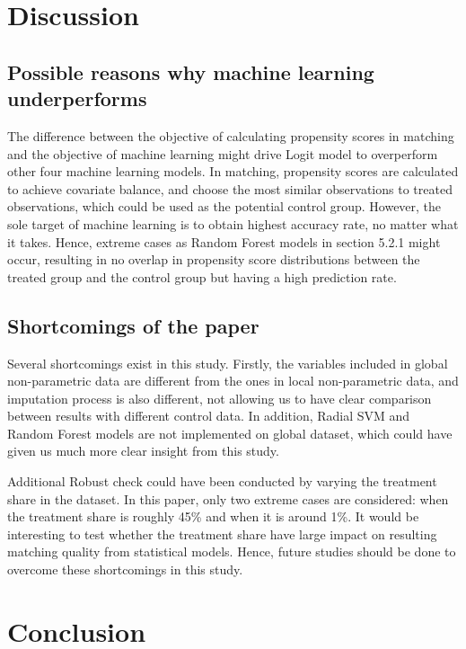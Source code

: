 \documentclass[11pt,a4paper,oneside]{article}
\begin{document}
\section{Discussion}


\subsection{Possible reasons why machine learning underperforms}
The difference between the objective of calculating propensity scores in matching and the objective of machine learning might drive Logit model to overperform other four machine learning models. In matching, propensity scores are calculated to achieve covariate balance, and choose the most similar observations to treated observations, which could be used as the potential control group. However, the sole target of machine learning is to obtain highest accuracy rate, no matter what it takes. Hence, extreme cases as Random Forest models in section 5.2.1 might occur, resulting in no overlap in propensity score distributions between the treated group and the control group but having a high prediction rate.

\subsection{Shortcomings of the paper}
Several shortcomings exist in this study. Firstly, the variables included in global non-parametric data are different from the ones in local non-parametric data, and imputation process is also different, not allowing us to have clear comparison between results with different control data. In addition, Radial SVM and Random Forest models are not implemented on global dataset, which could have given us much more clear insight from this study. 
\par
Additional Robust check could have been conducted by varying the treatment share in the dataset. In this paper, only two extreme cases are considered: when the treatment share is roughly 45\% and when it is around 1\%. It would be interesting to test whether the treatment share have large impact on resulting matching quality from statistical models. Hence, future studies should be done to overcome these shortcomings in this study.

\section{Conclusion}
\end{document}
